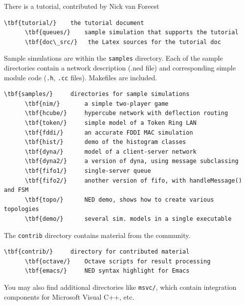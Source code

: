There is a tutorial, contributed by Nick van Foreest

\begin{Verbatim}[commandchars=\\\{\}]
    \tbf{tutorial/}    the tutorial document
      \tbf{queues/}    sample simulation that supports the tutorial
      \tbf{doc\_src/}   the Latex sources for the tutorial doc
\end{Verbatim}

Sample simulations are within the \texttt{samples} directory. Each of the
sample directories contain a network description (.ned file) and
corresponding simple module code (\texttt{.h}, \texttt{.cc} files).
Makefiles are included.

\begin{Verbatim}[commandchars=\\\{\}]
    \tbf{samples/}     directories for sample simulations
      \tbf{nim/}       a simple two-player game
      \tbf{hcube/}     hypercube network with deflection routing
      \tbf{token/}     simple model of a Token Ring LAN
      \tbf{fddi/}      an accurate FDDI MAC simulation
      \tbf{hist/}      demo of the histogram classes
      \tbf{dyna/}      model of a client-server network
      \tbf{dyna2/}     a version of dyna, using message subclassing
      \tbf{fifo1/}     single-server queue
      \tbf{fifo2/}     another version of fifo, with handleMessage() and FSM
      \tbf{topo/}      NED demo, shows how to create various topologies
      \tbf{demo/}      several sim. models in a single executable
\end{Verbatim}


The \texttt{contrib} directory contains material from the {\opp} community.

\begin{Verbatim}[commandchars=\\\{\}]
    \tbf{contrib/}     directory for contributed material
      \tbf{octave/}    Octave scripts for result processing
      \tbf{emacs/}     NED syntax highlight for Emacs
\end{Verbatim}

You may also find additional directories like \texttt{msvc/}, which contain
integration components for Microsoft Visual C++, etc.


